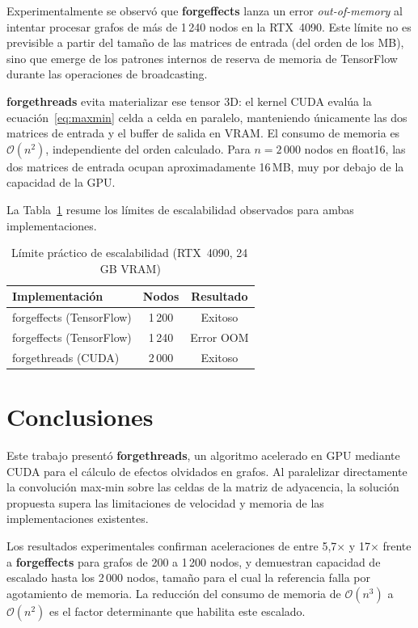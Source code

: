 \documentclass[conference]{IEEEtran}
\begin{document}
Experimentalmente se observó que \textbf{forgeffects} lanza un error \textit{out-of-memory} al intentar procesar grafos de más de 1\,240 nodos en la RTX~4090. Este límite no es previsible a partir del tamaño de las matrices de entrada (del orden de los MB), sino que emerge de los patrones internos de reserva de memoria de TensorFlow durante las operaciones de broadcasting.

\textbf{forgethreads} evita materializar ese tensor 3D: el kernel CUDA evalúa la ecuación~\eqref{eq:maxmin} celda a celda en paralelo, manteniendo únicamente las dos matrices de entrada y el buffer de salida en VRAM. El consumo de memoria es $\mathcal{O}(n^2)$, independiente del orden calculado. Para $n = 2\,000$ nodos en float16, las dos matrices de entrada ocupan aproximadamente 16\,MB, muy por debajo de la capacidad de la GPU.

La Tabla~\ref{tab:memory} resume los límites de escalabilidad observados para ambas implementaciones.

\begin{table}[htbp]
\caption{Límite práctico de escalabilidad (RTX~4090, 24\,GB VRAM)}
\begin{center}
\begin{tabular}{|l|c|c|}
\hline
\textbf{Implementación} & \textbf{Nodos} & \textbf{Resultado} \\
\hline
forgeffects (TensorFlow) & 1\,200 & Exitoso \\
forgeffects (TensorFlow) & 1\,240 & Error OOM \\
forgethreads (CUDA)      & 2\,000 & Exitoso \\
\hline
\end{tabular}
\label{tab:memory}
\end{center}
\end{table}

\section{Conclusiones}
\label{sec:conclusion}

Este trabajo presentó \textbf{forgethreads}, un algoritmo acelerado en GPU mediante CUDA para el cálculo de efectos olvidados en grafos. Al paralelizar directamente la convolución max-min sobre las celdas de la matriz de adyacencia, la solución propuesta supera las limitaciones de velocidad y memoria de las implementaciones existentes.

Los resultados experimentales confirman aceleraciones de entre 5{,}7$\times$ y 17$\times$ frente a \textbf{forgeffects} para grafos de 200 a 1\,200 nodos, y demuestran capacidad de escalado hasta los 2\,000 nodos, tamaño para el cual la referencia falla por agotamiento de memoria. La reducción del consumo de memoria de $\mathcal{O}(n^3)$ a $\mathcal{O}(n^2)$ es el factor determinante que habilita este escalado.
\end{document}
